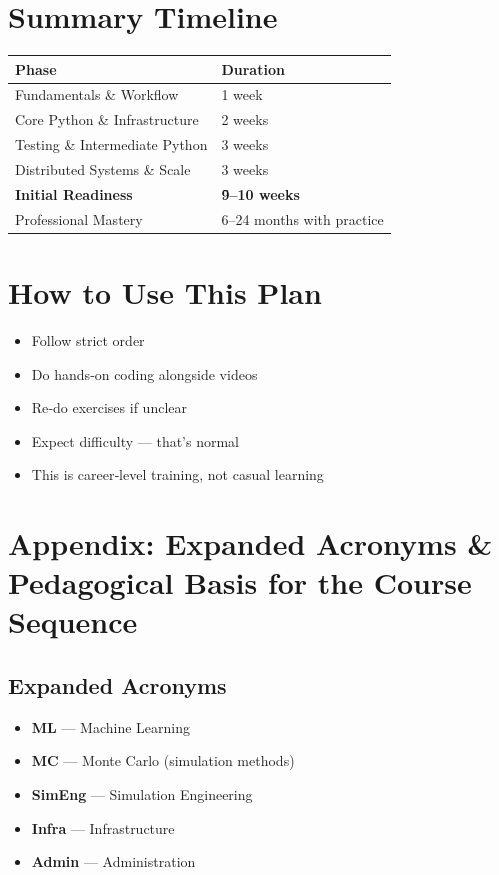 \documentclass[12pt]{article}
\begin{document}
	\newpage
	
	\section*{ Summary Timeline}
	
	\begin{tabularx}{\textwidth}{|l|X|}
		\hline
		\textbf{Phase} & \textbf{Duration} \\
		\hline
		Fundamentals \& Workflow & 1 week \\
		\hline
		Core Python \& Infrastructure & 2 weeks \\
		\hline
		Testing \& Intermediate Python & 3 weeks \\
		\hline
		Distributed Systems \& Scale & 3 weeks \\
		\hline
		\textbf{Initial Readiness} & \textbf{\~9–10 weeks} \\
		\hline
		Professional Mastery & 6–24 months with practice \\
		\hline
	\end{tabularx}
	
	\vspace{0.5cm}
	
	\section*{How to Use This Plan}
	\begin{itemize}
		\item Follow strict order
		\item Do hands‑on coding alongside videos
		\item Re‑do exercises if unclear
		\item Expect difficulty — that’s normal
		\item This is career‑level training, not casual learning
	\end{itemize}
	
	\newpage
	
	\section*{ Appendix: Expanded Acronyms \& Pedagogical Basis for the Course Sequence}
	
	\subsection*{Expanded Acronyms}
	\begin{itemize}
		\item \textbf{ML} — Machine Learning
		\item \textbf{MC} — Monte Carlo (simulation methods)
		\item \textbf{SimEng} — Simulation Engineering
		\item \textbf{Infra} — Infrastructure
		\item \textbf{Admin} — Administration
	\end{itemize}
	
\end{document}
